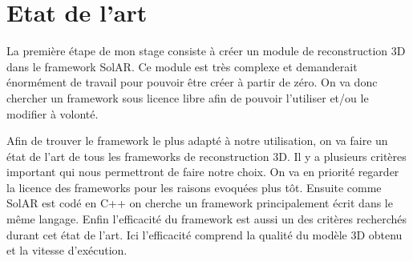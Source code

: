 \chapter{Etat de l'art}
\par
    La première étape de mon stage consiste à créer un module de reconstruction 3D dans le framework SolAR. Ce module est très complexe et demanderait énormément de travail pour pouvoir être créer à partir de zéro. On va donc chercher un framework sous licence libre afin de pouvoir l'utiliser et/ou le modifier à volonté.

    Afin de trouver le framework le plus adapté à notre utilisation, on va faire un état de l'art de tous les frameworks de reconstruction 3D. Il y a plusieurs critères important qui nous permettront de faire notre choix. On va en priorité regarder la licence des frameworks pour les raisons evoquées plus tôt. Ensuite comme SolAR est codé en C++ on cherche un framework principalement écrit dans le même langage. Enfin l'efficacité du framework est aussi un des critères recherchés durant cet état de l'art. Ici l'efficacité comprend la qualité du modèle 3D obtenu et la vitesse d'exécution.